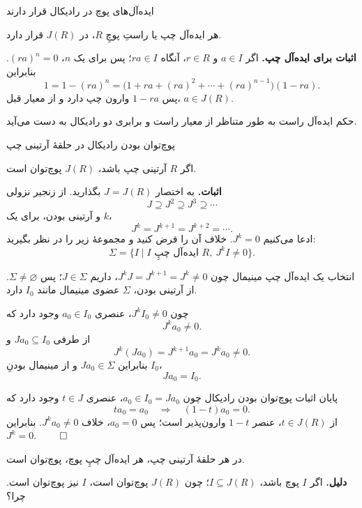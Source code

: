 \begin{frame}[t]{ایده‌آل‌های پوچ در رادیکال قرار دارند}
\label{lec15:nil-contained-radical}
\begin{theorem}
هر ایده‌آل چپ یا راستِ پوچِ \(R\)، در \(J(R)\) قرار دارد.
\end{theorem}
\textbf{اثبات برای ایده‌آل چپ.} اگر \(a\in I\) و \(r\in R\)، آنگاه \(ra\in I\)؛ پس برای یک \(n\)، \((ra)^n=0\). بنابراین
\[
 1=1-(ra)^n
 =\bigl(1+ra+(ra)^2+\cdots+(ra)^{n-1}\bigr)(1-ra).
\]
پس \(1-ra\) وارون چپ دارد و از معیار قبل، \(a\in J(R)\).
\medskip

حکم ایده‌آل راست به طور متناظر از معیار راست و برابری دو رادیکال به دست می‌آید.
\end{frame}

\begin{frame}[t]{پوچ‌توان بودن رادیکال در حلقهٔ آرتینی چپ}
\label{lec15:artinian-radical-nilpotent}
\begin{theorem}
اگر \(R\) آرتینی چپ باشد، \(J(R)\) پوچ‌توان است.
\end{theorem}
\textbf{اثبات.} به اختصار \(J=J(R)\) بگذارید. از زنجیر نزولی
\[
 J\supseteq J^2\supseteq J^3\supseteq\cdots
\]
و آرتینی بودن، برای یک \(k\)،
\[
 J^k=J^{k+1}=J^{k+2}=\cdots.
\]
ادعا می‌کنیم \(J^k=0\). خلاف آن را فرض کنید و مجموعهٔ زیر را در نظر بگیرید:
\[
 \Sigma=\{I\mid I\text{ ایده‌آل چپِ }R,\ J^kI\ne0\}.
\]
\end{frame}

\begin{frame}[t]{انتخاب یک ایده‌آل چپ مینیمال}
\label{lec15:radical-minimal-ideal}
چون \(J^kJ=J^{k+1}=J^k\ne0\)، داریم \(J\in\Sigma\)؛ پس \(\Sigma\ne\varnothing\).
از آرتینی بودن، \(\Sigma\) عضوی مینیمال مانند \(I_0\) دارد.
\medskip

چون \(J^kI_0\ne0\)، عنصری \(a_0\in I_0\) وجود دارد که
\[
 J^ka_0\ne0.
\]
از طرفی \(Ja_0\subseteq I_0\) و
\[
 J^k(Ja_0)=J^{k+1}a_0=J^ka_0\ne0.
\]
بنابراین \(Ja_0\in\Sigma\) و از مینیمال بودنِ \(I_0\)،
\[
 Ja_0=I_0.
\]
\end{frame}

\begin{frame}[t]{پایان اثبات پوچ‌توان بودن رادیکال}
\label{lec15:radical-nilpotent-conclusion}
چون \(a_0\in I_0=Ja_0\)، عنصری \(t\in J\) وجود دارد که
\[
 ta_0=a_0\quad\Longrightarrow\quad(1-t)a_0=0.
\]
از \(t\in J(R)\)، عنصر \(1-t\) وارون‌پذیر است؛ پس \(a_0=0\)، خلاف \(J^ka_0\ne0\).
بنابراین \(J^k=0\). \hfill\(\qed\)
\begin{corollary}
در هر حلقهٔ آرتینی چپ، هر ایده‌آل چپِ پوچ، پوچ‌توان است.
\end{corollary}
\textbf{دلیل.} اگر \(I\) پوچ باشد، \(I\subseteq J(R)\)؛ چون \(J(R)\) پوچ‌توان است، \(I\) نیز پوچ‌توان است. \alert{چرا؟}
\end{frame}

